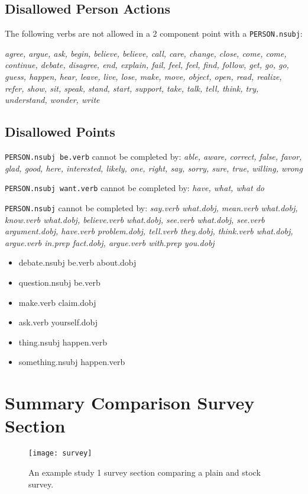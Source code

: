 \begin{appendices}
      \section{Disallowed Person Actions}
        The following verbs are not allowed in a 2 component point with a \texttt{PERSON.nsubj}:

        \textit{agree, argue, ask, begin, believe, believe, call, care, change, close, come, come, continue, debate, disagree, end, explain, fail, feel, feel, find, follow, get, go, go, guess, happen, hear, leave, live, lose, make, move, object, open, read, realize, refer, show, sit, speak, stand, start, support, take, talk, tell, think, try, understand, wonder, write}

      \section{Disallowed Points}
        \texttt{PERSON.nsubj be.verb} cannot be completed by: \textit{able, aware, correct, false, favor, glad, good, here, interested, likely, one, right, say, sorry, sure, true, willing, wrong}

        \noindent\texttt{PERSON.nsubj want.verb} cannot be completed by: \textit{have, what, what do}

        \noindent\texttt{PERSON.nsubj} cannot be completed by: \textit{say.verb what.dobj, mean.verb what.dobj, know.verb what.dobj, believe.verb what.dobj, see.verb what.dobj, see.verb argument.dobj, have.verb problem.dobj, tell.verb they.dobj, think.verb what.dobj, argue.verb in.prep fact.dobj, argue.verb with.prep you.dobj}

        \begin{itemize}
		  \item{debate.nsubj be.verb about.dobj}
		  \item{question.nsubj be.verb}
		  \item{make.verb claim.dobj}
		  \item{ask.verb yourself.dobj}
		  \item{thing.nsubj happen.verb}
		  \item{something.nsubj happen.verb}
        \end{itemize}

    \chapter{Summary Comparison Survey Section\label{app:survey-section}}
      \begin{figure}[h]
        \caption{An example study 1 survey section comparing a plain and stock survey.}
        \centering
        \texttt{[image: survey]}
      \end{figure}


\end{appendices}
